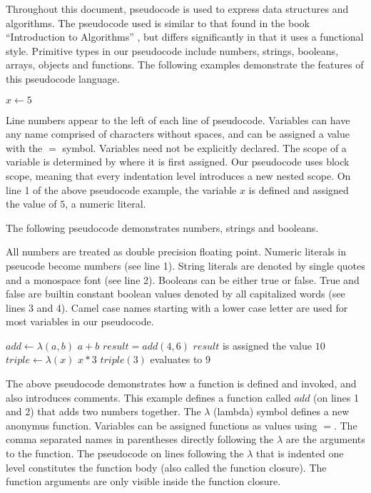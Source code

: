 Throughout this document, pseudocode is used to express data structures and algorithms. The pseudocode used is similar to that found in the book ``Introduction to Algorithms'' \cite{cormen2009introduction}, but differs significantly in that it uses a functional style. Primitive types in our pseudocode include numbers, strings, booleans, arrays, objects and functions. The following examples demonstrate the features of this pseudocode language.

\begin{codebox}
\li $x \gets 5$
\end{codebox}

Line numbers appear to the left of each line of pseudocode. Variables can have any name comprised of characters without spaces, and can be assigned a value with the $=$ symbol. Variables need not be explicitly declared. The scope of a variable is determined by where it is first assigned. Our pseudocode uses block scope, meaning that every indentation level introduces a new nested scope. On line 1 of the above pseudocode example, the variable $x$ is defined and assigned the value of $5$, a numeric literal.

The following pseudocode demonstrates numbers, strings and booleans.


All numbers are treated as double precision floating point. Numeric literals in pseucode become numbers (see line 1). String literals are denoted by single quotes and a monospace font (see line 2). Booleans can be either true or false. True and false are builtin constant boolean values denoted by all capitalized words (see lines 3 and 4). Camel case names starting with a lower case letter are used for most variables in our pseudocode.

\begin{codebox}
\li $add \gets \lambda(a, b)$
\Do
\li \Return $ a + b $
\End
\li $result = add(4, 6)$ \Comment $result$ is assigned the value $10$
\li $triple \gets \lambda(x)$ \Return $ x * 3 $
\li $triple(3)$ \Comment evaluates to $9$
\end{codebox}

The above pseudocode demonstrates how a function is defined and invoked, and also introduces comments. This example defines a function called $add$ (on lines 1 and 2) that adds two numbers together. The $\lambda$ (lambda) symbol defines a new anonymus function. Variables can be assigned functions as values using $=$. The comma separated names in parentheses directly following the $\lambda$ are the arguments to the function. The pseudocode on lines following the $\lambda$ that is indented one level constitutes the function body (also called the function closure). The function arguments are only visible inside the function closure.

